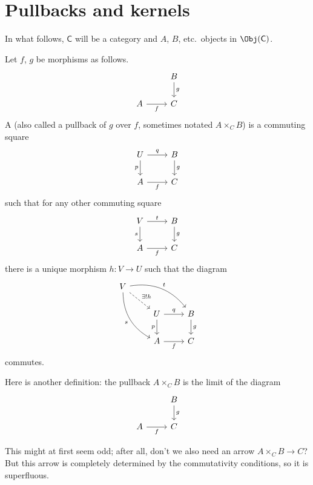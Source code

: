 \documentclass[main.tex]{subfiles}
\begin{document}
\section{Pullbacks and kernels}

In what follows, $\mathsf{C}$ will be a category and $A$, $B$, etc.\ objects in $\Obj(\mathsf{C})$.
\begin{definition}[pullback]
  \label{def:pullback_along_a_functor}
  Let $f$, $g$ be morphisms as follows.
  \begin{equation*}
    \begin{tikzcd}
      & B \arrow[d, "g"] \\
      A \arrow[r, swap, "f"] & C
    \end{tikzcd}
  \end{equation*}
  A  (also called a pullback of $g$ over $f$, sometimes notated $A \times_{C} B$) is a commuting square
  \begin{equation*}
    \begin{tikzcd}
      U \arrow[r, "q"] \arrow[d, "p", swap] & B \arrow[d, "g"] \\
      A \arrow[r, swap, "f"] & C
    \end{tikzcd}
  \end{equation*}
  such that for any other commuting square
  \begin{equation*}
    \begin{tikzcd}
      V \arrow[r, "t"] \arrow[d, "s", swap] & B \arrow[d, "g"] \\
      A \arrow[r, swap, "f"] & C
    \end{tikzcd}
  \end{equation*}
  there is a unique morphism $h\colon V \to U$ such that the diagram
  \begin{equation*}
    \begin{tikzcd}
      V
      \arrow[rrd, bend left, "t"]
      \arrow[rd, dashed, "\exists!h"]
      \arrow[rdd, bend right, swap, "s"]
      \\
      & U
      \arrow[r, "q"]
      \arrow[d, swap, "p"]
      & B
      \arrow[d, "g"]
      \\
      & A
      \arrow[r, swap, "f"]
      & C
    \end{tikzcd}
  \end{equation*}
  commutes.
\end{definition}
\begin{note}
  Here is another definition: the pullback $A \times_{C} B$ is the limit of the diagram
  \begin{equation*}
    \begin{tikzcd}
      & B
      \arrow[d, "g"]
      \\
      A
      \arrow[r, swap, "f"]
      & C
    \end{tikzcd}
  \end{equation*}

  This might at first seem odd; after all, don't we also need an arrow $A \times_{C} B \to C$? But this arrow is completely determined by the commutativity conditions, so it is superfluous.
\end{note}
\end{document}
